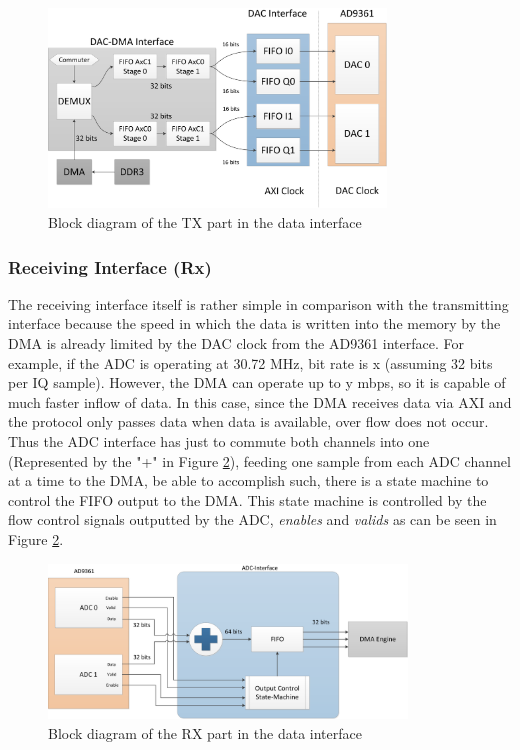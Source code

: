 \begin{figure}[htbp]
    \centering
    \includegraphics[width=0.80\textwidth]{./figures/txdata_if}
    \caption{ Block diagram of the TX part in the data interface
    \label{fig:dataiftx}}
\end{figure}

\subsubsection{Receiving Interface (Rx)}

The receiving interface itself is rather simple in comparison with the
transmitting interface because the speed in which the data is written into the
memory by the DMA is already limited by the DAC clock from the AD9361 interface.
For example, if the ADC is operating at 30.72 MHz, bit rate is x (assuming 32
bits per IQ sample). However, the DMA can operate up to y mbps, so it is capable
of much faster inflow of data. In this case, since the DMA receives data via AXI
and the protocol only passes data when data is available, over flow does not
occur. Thus the ADC interface has just to commute both channels into one
(Represented by the "+" in Figure \ref{fig:dataifrx}), feeding one sample from
each ADC channel at a time to the DMA, be able to accomplish such, there is a
state machine to control the FIFO output to the DMA. This state machine is
controlled by the flow control signals outputted by the ADC, \emph{enables} and
\emph{valids} as can be seen in Figure \ref{fig:dataifrx}.

\begin{figure}[htbp]
    \centering
    \includegraphics[width=0.85\textwidth]{./figures/rxdata_if}
    \caption{ Block diagram of the RX part in the data interface
    \label{fig:dataifrx}}
\end{figure}


